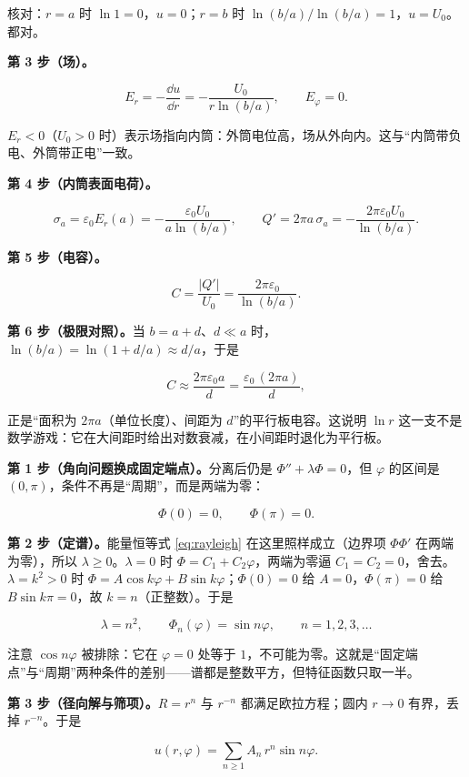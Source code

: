 \documentclass[11pt]{ctexart}
\begin{document}
核对：$r=a$ 时 $\ln1=0$，$u=0$；$r=b$ 时 $\ln(b/a)/\ln(b/a)=1$，$u=U_0$。都对。

\textbf{第 3 步（场）。}

\[
E_r=-\frac{\dd u}{\dd r}=-\frac{U_0}{r\ln(b/a)},\qquad E_\varphi=0 .
\]

$E_r<0$（$U_0>0$ 时）表示场指向内筒：外筒电位高，场从外向内。这与“内筒带负电、外筒带正电”一致。

\textbf{第 4 步（内筒表面电荷）。}

\[
\sigma_a=\varepsilon_0E_r(a)=-\frac{\varepsilon_0U_0}{a\ln(b/a)},\qquad
Q'=2\pi a\,\sigma_a=-\frac{2\pi\varepsilon_0U_0}{\ln(b/a)} .
\]

\textbf{第 5 步（电容）。}

\[
C=\frac{|Q'|}{U_0}=\frac{2\pi\varepsilon_0}{\ln(b/a)} .
\]

\textbf{第 6 步（极限对照）。}当 $b=a+d$、$d\ll a$ 时，$\ln(b/a)=\ln(1+d/a)\approx d/a$，于是

\[
C\approx\frac{2\pi\varepsilon_0 a}{d}=\frac{\varepsilon_0\,(2\pi a)}{d},
\]

正是“面积为 $2\pi a$（单位长度）、间距为 $d$”的平行板电容。这说明 $\ln r$ 这一支不是数学游戏：它在大间距时给出对数衰减，在小间距时退化为平行板。


\textbf{第 1 步（角向问题换成固定端点）。}分离后仍是 $\Phi''+\lambda\Phi=0$，但 $\varphi$ 的区间是 $(0,\pi)$，条件不再是“周期”，而是两端为零：

\[
\Phi(0)=0,\qquad \Phi(\pi)=0 .
\]

\textbf{第 2 步（定谱）。}能量恒等式 \eqref{eq:rayleigh} 在这里照样成立（边界项 $\Phi\Phi'$ 在两端为零），所以 $\lambda\ge0$。$\lambda=0$ 时 $\Phi=C_1+C_2\varphi$，两端为零逼 $C_1=C_2=0$，舍去。$\lambda=k^2>0$ 时 $\Phi=A\cos k\varphi+B\sin k\varphi$；$\Phi(0)=0$ 给 $A=0$，$\Phi(\pi)=0$ 给 $B\sin k\pi=0$，故 $k=n$（正整数）。于是

\[
\lambda=n^2,\qquad \Phi_n(\varphi)=\sin n\varphi,\qquad n=1,2,3,\dots
\]

注意 $\cos n\varphi$ 被排除：它在 $\varphi=0$ 处等于 $1$，不可能为零。这就是“固定端点”与“周期”两种条件的差别——谱都是整数平方，但特征函数只取一半。

\textbf{第 3 步（径向解与筛项）。}$R=r^n$ 与 $r^{-n}$ 都满足欧拉方程；圆内 $r\to0$ 有界，丢掉 $r^{-n}$。于是

\[
u(r,\varphi)=\sum_{n\ge1}A_n\,r^n\sin n\varphi .
\]
\end{document}
